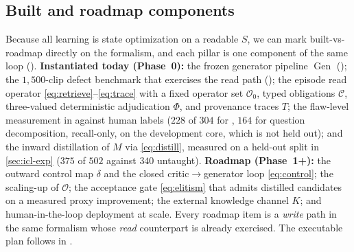 \subsection{Built and roadmap components}
\label{sec:framework:builtvsroadmap}

Because all learning is state optimization on a readable $S$, we can mark
built-vs-roadmap directly on the formalism, and each pillar is one component of the
same loop (). \textbf{Instantiated
today (Phase~0):} the frozen generator pipeline $\operatorname{Gen}$
(); the $1{,}500$-clip defect benchmark that exercises the
read path (); the episode read operator
\eqref{eq:retrieve}--\eqref{eq:trace} with a fixed operator set $\mathcal{O}_0$, typed
obligations $\mathcal{C}$, three-valued deterministic adjudication $\Phi$, and provenance
traces $T$; the flaw-level measurement in  against human labels
($228$ of $304$ for \PhyReAct{}, $164$ for question decomposition, recall-only, on the development core, which is
not held out); and the inward distillation of
$M$ via \eqref{eq:distill}, measured on a held-out split in
\cref{sec:icl-exp} ($375$ of $502$ against $340$ untaught).
\textbf{Roadmap (Phase~1+):} the
outward control map $\delta$ and the closed critic$\rightarrow$generator loop
\eqref{eq:control}; the scaling-up of $\mathcal{O}$; the acceptance gate \eqref{eq:elitism}
that admits distilled candidates on a measured proxy improvement; the external
knowledge channel $K$; and human-in-the-loop deployment at scale. Every roadmap item is a \emph{write}
path in the same formalism whose \emph{read} counterpart is already exercised. The executable
plan follows in .

